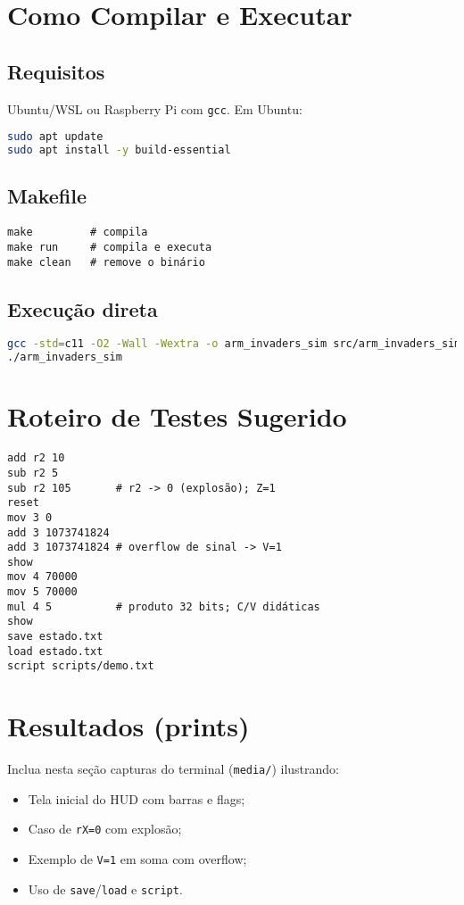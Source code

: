 \documentclass[12pt,a4paper]{article}
\begin{document}
\section{Como Compilar e Executar}
\subsection{Requisitos}
Ubuntu/WSL ou Raspberry Pi com \texttt{gcc}. Em Ubuntu:
\begin{lstlisting}[language=bash]
sudo apt update
sudo apt install -y build-essential
\end{lstlisting}

\subsection{Makefile}
\begin{lstlisting}
make         # compila
make run     # compila e executa
make clean   # remove o binário
\end{lstlisting}

\subsection{Execução direta}
\begin{lstlisting}[language=bash]
gcc -std=c11 -O2 -Wall -Wextra -o arm_invaders_sim src/arm_invaders_sim.c
./arm_invaders_sim
\end{lstlisting}

\section{Roteiro de Testes Sugerido}
\begin{lstlisting}
add r2 10
sub r2 5
sub r2 105       # r2 -> 0 (explosão); Z=1
reset
mov 3 0
add 3 1073741824
add 3 1073741824 # overflow de sinal -> V=1
show
mov 4 70000
mov 5 70000
mul 4 5          # produto 32 bits; C/V didáticas
show
save estado.txt
load estado.txt
script scripts/demo.txt
\end{lstlisting}

\section{Resultados (prints)}
Inclua nesta seção capturas do terminal (\texttt{media/}) ilustrando:
\begin{itemize}[noitemsep]
  \item Tela inicial do HUD com barras e flags;
  \item Caso de \texttt{rX=0} com explosão;
  \item Exemplo de \texttt{V=1} em soma com overflow;
  \item Uso de \texttt{save}/\texttt{load} e \texttt{script}.
\end{itemize}
\end{document}
